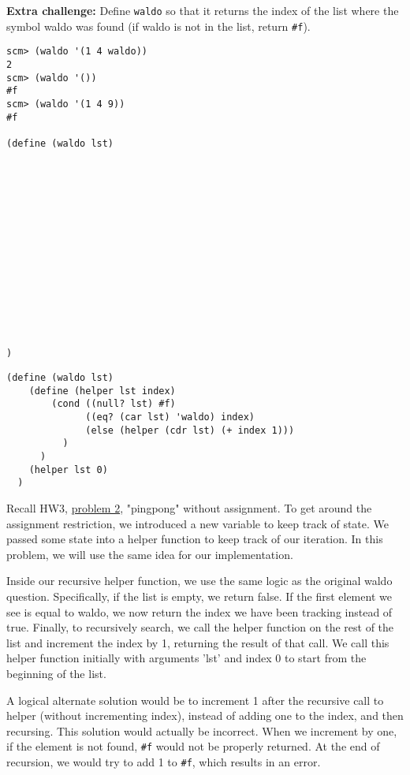\begin{blocksection}

\question \textbf{Extra challenge:} Define \texttt{waldo} so that it returns the index of
the list where the symbol waldo was found (if waldo is not in the list, return
\texttt{\#f}).
\begin{lstlisting}
scm> (waldo '(1 4 waldo))
2
scm> (waldo '())
#f
scm> (waldo '(1 4 9))
#f

(define (waldo lst)















)
\end{lstlisting}

\begin{solution}[0.5in]
\begin{lstlisting}
(define (waldo lst)
    (define (helper lst index)
        (cond ((null? lst) #f)
              ((eq? (car lst) 'waldo) index)
              (else (helper (cdr lst) (+ index 1)))
          )
      )
    (helper lst 0)
  )
\end{lstlisting}
\end{solution}
\end{blocksection}

\begin{blocksection}
\begin{solution}
Recall HW3, \href{https://cs61a.org/hw/hw03/#q2}{problem 2}, "pingpong" without assignment. To get around the assignment restriction, we introduced a new variable to keep track of state. We passed some state into a helper function to keep track of our iteration. In this problem, we will use the same idea for our implementation.

Inside our recursive helper function, we use the same logic as the original waldo question. Specifically, if the list is empty, we return false. If the first element we see is equal to waldo, we now return the index we have been tracking instead of true. Finally, to recursively search, we call the helper function on the rest of the list and increment the index by 1, returning the result of that call. We call this helper function initially with arguments 'lst' and index 0 to start from the beginning of the list. 

A logical alternate solution would be to increment 1 after the recursive call to helper (without incrementing index), instead of adding one to the index, and then recursing. This solution would actually be incorrect. When we increment by one, if the element is not found, \texttt{\#f} would not be properly returned. At the end of recursion, we would try to add 1 to \texttt{\#f}, which results in an error.
\end{solution}

\end{blocksection}
